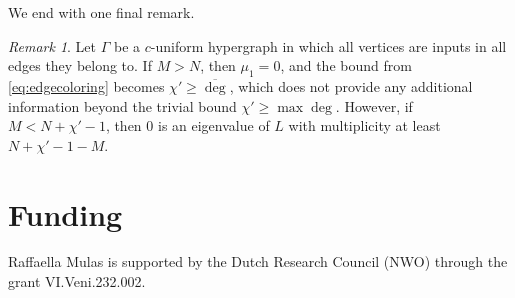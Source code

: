 \documentclass{article}
\theoremstyle{plain}
\theoremstyle{definition}
\theoremstyle{remark}
\newtheorem{remark}[theorem]{Remark}
\begin{document}
We end with one final remark.
\begin{remark}
    Let $\Gamma$ be a $c$-uniform hypergraph in which all vertices are inputs in all edges they belong to.
    If $M>N$, then $\mu_1=0$, and the bound from \eqref{eq:edgecoloring} becomes $\chi'\geq\overline{\deg}$, which does not provide any additional information beyond the trivial bound $\chi'\geq \max\deg$. However, if $M<N+\chi'-1$, then $0$ is an eigenvalue of $L$ with multiplicity at least $N+\chi'-1-M$.
\end{remark}

\section*{Funding}
Raffaella Mulas is supported by the Dutch Research Council (NWO) through the grant VI.Veni.232.002.


\color{black}
 


\end{document}
